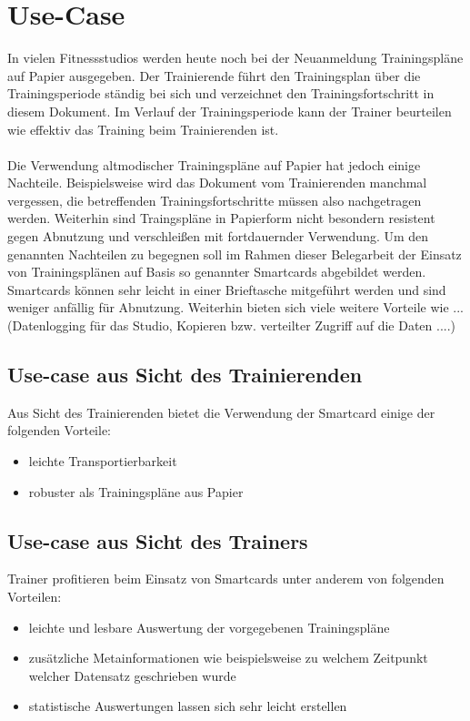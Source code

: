 \documentclass[a4paper,12pt]{scrartcl}
\begin{document}

\clearpage
\section{Use-Case}
\label{sec:1}
In vielen Fitnessstudios werden heute noch bei der Neuanmeldung Trainingspläne auf Papier ausgegeben. Der Trainierende führt den Trainingsplan über die Trainingsperiode ständig bei sich und verzeichnet den Trainingsfortschritt in diesem Dokument.
Im Verlauf der Trainingsperiode kann der Trainer beurteilen wie effektiv das Training beim Trainierenden ist.\\
\\
Die Verwendung altmodischer Trainingspläne auf Papier hat jedoch einige Nachteile. Beispielsweise wird das Dokument vom Trainierenden manchmal vergessen, die betreffenden Trainingsfortschritte müssen also nachgetragen werden. 
Weiterhin sind Traingspläne in Papierform nicht besondern resistent gegen Abnutzung und verschleißen mit fortdauernder Verwendung. Um den genannten Nachteilen zu begegnen soll im Rahmen dieser Belegarbeit der Einsatz von Trainingsplänen
auf Basis so genannter Smartcards abgebildet werden. Smartcards können sehr leicht in einer Brieftasche mitgeführt werden und sind weniger anfällig für Abnutzung. Weiterhin bieten sich viele weitere Vorteile wie ... (Datenlogging für das Studio, Kopieren bzw. 
verteilter Zugriff auf die Daten ....) 


\subsection{Use-case aus Sicht des Trainierenden}
\label{subsec:1.1}

Aus Sicht des Trainierenden bietet die Verwendung der Smartcard einige der folgenden Vorteile:
\begin{itemize}
\item leichte Transportierbarkeit
\item robuster als Trainingspläne aus Papier
\end{itemize}


\subsection{Use-case aus Sicht des Trainers}
\label{subsec:1.2}
Trainer profitieren beim Einsatz von Smartcards unter anderem von folgenden Vorteilen:
\begin{itemize}
\item leichte und lesbare Auswertung der vorgegebenen Trainingspläne
\item zusätzliche Metainformationen wie beispielsweise zu welchem Zeitpunkt welcher Datensatz geschrieben wurde
\item statistische Auswertungen lassen sich sehr leicht erstellen 
\end{itemize}
\end{document}
